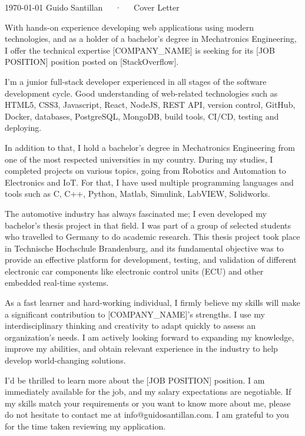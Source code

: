 \documentclass[11pt, a4paper]{awesome-cv}
\begin{document}
\makecvheader[C]

\makecvfooter
  {\today}
  {Guido Santillan~~~·~~~Cover Letter}
  {}

\makelettertitle

\begin{cvletter}

With hands-on experience developing web applications using modern technologies, and as a holder of a bachelor's degree in Mechatronics Engineering, I offer the technical expertise [COMPANY_NAME] is seeking for its [JOB POSITION] position posted on [StackOverflow].

I'm a junior full-stack developer experienced in all stages of the software development cycle. Good understanding of web-related technologies such as HTML5, CSS3, Javascript, React, NodeJS, REST API, version control, GitHub, Docker, databases, PostgreSQL, MongoDB, build tools, CI/CD, testing and deploying.

In addition to that, I hold a bachelor's degree in Mechatronics Engineering from one of the most respected universities in my country. During my studies, I completed projects on various topics, going from Robotics and Automation to Electronics and IoT. For that, I have used multiple programming languages and tools such as C, C++, Python, Matlab, Simulink, LabVIEW, Solidworks.

The automotive industry has always fascinated me; I even developed my bachelor's thesis project in that field. I was part of a group of selected students who travelled to Germany to do academic research. This thesis project took place in Technische Hochschule Brandenburg, and its fundamental objective was to provide an effective platform for development, testing, and validation of different electronic car components like electronic control units (ECU) and other embedded real-time systems.

As a fast learner and hard-working individual, I firmly believe my skills will make a significant contribution to [COMPANY_NAME]'s strengths. I use my interdisciplinary thinking and creativity to adapt quickly to assess an organization's needs. I am actively looking forward to expanding my knowledge, improve my abilities, and obtain relevant experience in the industry to help develop world-changing solutions.

I'd be thrilled to learn more about the [JOB POSITION] position. I am immediately available for the job, and my salary expectations are negotiable. If my skills match your requirements or you want to know more about me, please do not hesitate to contact me at info@guidosantillan.com. I am grateful to you for the time taken reviewing my application.

\end{cvletter}
\end{document}
